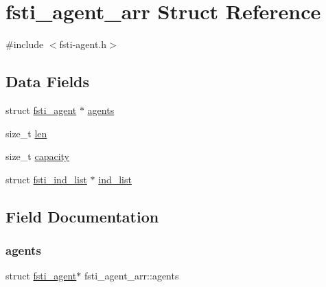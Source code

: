 \hypertarget{structfsti__agent__arr}{}\section{fsti\+\_\+agent\+\_\+arr Struct Reference}
\label{structfsti__agent__arr}


{\ttfamily \#include $<$fsti-\/agent.\+h$>$}

\subsection*{Data Fields}
\begin{DoxyCompactItemize}
\item 
struct \mbox{\hyperlink{structfsti__agent}{fsti\+\_\+agent}} $\ast$ \mbox{\hyperlink{structfsti__agent__arr_a7e4787915398bdddff99fa7526ffd1df}{agents}}
\item 
size\+\_\+t \mbox{\hyperlink{structfsti__agent__arr_a7a3aad9a85b02c5bdeac139912f2dd94}{len}}
\item 
size\+\_\+t \mbox{\hyperlink{structfsti__agent__arr_a6b584cff02d8f68448a2c1a948880279}{capacity}}
\item 
struct \mbox{\hyperlink{structfsti__ind__list}{fsti\+\_\+ind\+\_\+list}} $\ast$ \mbox{\hyperlink{structfsti__agent__arr_ae71448f56b3474ebeb7efecab3651968}{ind\+\_\+list}}
\end{DoxyCompactItemize}


\subsection{Field Documentation}
\mbox{\label{structfsti__agent__arr_a7e4787915398bdddff99fa7526ffd1df}} 
\subsubsection{\texorpdfstring{agents}{agents}}
{\footnotesize\ttfamily struct \mbox{\hyperlink{structfsti__agent}{fsti\+\_\+agent}}$\ast$ fsti\+\_\+agent\+\_\+arr\+::agents}

\mbox{\label{structfsti__agent__arr_a6b584cff02d8f68448a2c1a948880279}} 
